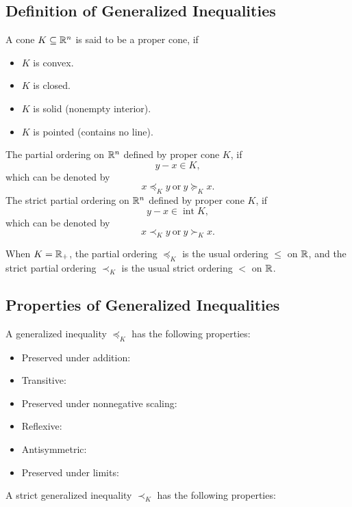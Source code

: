 \subsection{Definition of Generalized Inequalities}

\begin{definition}\label{def:proper-cone}
	A cone \(K\subseteq\mathbb{R}^n\) is said to be a proper cone, if
	\begin{itemize}
		\item \(K\) is convex.
		\item \(K\) is closed.
		\item \(K\) is solid (nonempty interior).
		\item \(K\) is pointed (contains no line).
	\end{itemize}
\end{definition}

\begin{definition}\label{def:generalized-inequalities}
	The partial ordering on \(\mathbb{R}^n\) defined by proper cone \(K\), if
	\begin{equation}
		y-x\in K,
	\end{equation}
	which can be denoted by
	\begin{equation}
		x\preceq_{K}y\ \text{or}\ y\succeq_{K}x.
	\end{equation}
	The strict partial ordering on \(\mathbb{R}^n\) defined by proper cone \(K\), if
	\begin{equation}
		y-x\in\operatorname{int}K,
	\end{equation}
	which can be denoted by
	\begin{equation}
		x\prec_{K}y\ \text{or}\ y\succ_{K}x.
	\end{equation}
\end{definition}

\begin{remark}
	When \(K=\mathbb{R}_{+}\), the partial ordering \(\preceq_{K}\) is the usual ordering \(\leq\) on \(\mathbb{R}\), and the strict partial ordering \(\prec_{K}\) is the usual strict ordering \(<\) on \(\mathbb{R}\).
\end{remark}

\subsection{Properties of Generalized Inequalities}

\begin{theorem}
	A generalized inequality \(\preceq_{K}\) has the following properties:
	\begin{itemize}
		\item Preserved under addition:
		\item Transitive:
		\item Preserved under nonnegative  scaling:
		\item Reflexive:
		\item Antisymmetric:
		\item Preserved under limits:
	\end{itemize}
	A strict generalized inequality \(\prec_{K}\) has the following properties:
\end{theorem}
